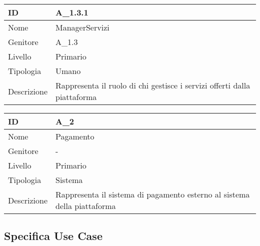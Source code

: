 \begin{center}
\begin{tabular}{ |p{2cm}|p{10cm}|  }
\hline
ID & A\_1.3.1 \\\hline
Nome & ManagerServizi\\\hline
Genitore & A\_1.3\\\hline
Livello &  Primario \\\hline
Tipologia & Umano \\\hline
Descrizione &  Rappresenta il ruolo di chi gestisce i servizi offerti dalla piattaforma \\\hline
\end{tabular}
\label{table_attore:1.3.1}\newline

\begin{tabular}{ |p{2cm}|p{10cm}|  }
\hline
ID & A\_2 \\\hline
Nome & Pagamento\\\hline
Genitore & - \\\hline
Livello &  Primario \\\hline
Tipologia & Sistema \\\hline
Descrizione &  Rappresenta il sistema di pagamento esterno al sistema della piattaforma \\\hline
\end{tabular}
\label{table_attore:2}\newline
\end{center}


\subsection{Specifica Use Case}

